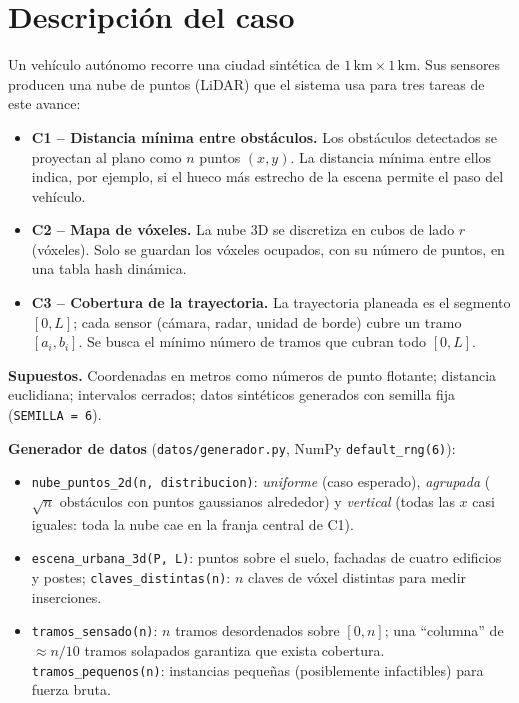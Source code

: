 \documentclass[11pt,letterpaper]{article}
\theoremstyle{plain}
\theoremstyle{definition}
\begin{document}
\section{Descripción del caso}

Un vehículo autónomo recorre una ciudad sintética de $1\,\text{km}\times 1\,\text{km}$. Sus sensores
producen una nube de puntos (LiDAR) que el sistema usa para tres tareas de este avance:
\begin{itemize}
  \item \textbf{C1 -- Distancia mínima entre obstáculos.} Los obstáculos detectados se proyectan al
  plano como $n$ puntos $(x,y)$. La distancia mínima entre ellos indica, por ejemplo, si el hueco
  más estrecho de la escena permite el paso del vehículo.
  \item \textbf{C2 -- Mapa de vóxeles.} La nube 3D se discretiza en cubos de lado $r$ (vóxeles).
  Solo se guardan los vóxeles ocupados, con su número de puntos, en una tabla hash dinámica.
  \item \textbf{C3 -- Cobertura de la trayectoria.} La trayectoria planeada es el segmento $[0,L]$;
  cada sensor (cámara, radar, unidad de borde) cubre un tramo $[a_i,b_i]$. Se busca el mínimo
  número de tramos que cubran todo $[0,L]$.
\end{itemize}

\textbf{Supuestos.} Coordenadas en metros como números de punto flotante; distancia euclidiana;
intervalos cerrados; datos sintéticos generados con semilla fija (\texttt{SEMILLA = 6}).

\textbf{Generador de datos} (\texttt{datos/generador.py}, NumPy \texttt{default\_rng(6)}):
\begin{itemize}
  \item \texttt{nube\_puntos\_2d(n, distribucion)}: \emph{uniforme} (caso esperado),
  \emph{agrupada} ($\sqrt n$ obstáculos con puntos gaussianos alrededor) y \emph{vertical}
  (todas las $x$ casi iguales: toda la nube cae en la franja central de C1).
  \item \texttt{escena\_urbana\_3d(P, L)}: puntos sobre el suelo, fachadas de cuatro edificios y
  postes; \texttt{claves\_distintas(n)}: $n$ claves de vóxel distintas para medir inserciones.
  \item \texttt{tramos\_sensado(n)}: $n$ tramos desordenados sobre $[0,n]$; una ``columna'' de
  $\approx n/10$ tramos solapados garantiza que exista cobertura.
  \texttt{tramos\_pequenos(n)}: instancias pequeñas (posiblemente infactibles) para fuerza bruta.
\end{itemize}
\end{document}
